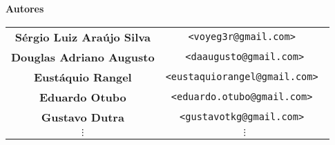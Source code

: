 \documentclass[10pt,a4paper,openany]{book}
\begin{document}
\newpage
\thispagestyle{empty}

\begin{center}
{\Huge \bf Autores}

\vspace{2cm}

\begin{tabular}{cc}

\bf Sérgio Luiz Araújo Silva & \tt <voyeg3r@gmail.com> \\
\bf Douglas Adriano Augusto & \tt <daaugusto@gmail.com>\\
\bf Eustáquio Rangel & \tt <eustaquiorangel@gmail.com> \\
\bf Eduardo Otubo & \tt <eduardo.otubo@gmail.com> \\
\bf Gustavo Dutra & \tt <gustavotkg@gmail.com> \\
$\vdots$ & $\vdots$ \\

\end{tabular}

\end{center}

\newpage
\tableofcontents

\setcounter{page}{0} %

































\printindex
\end{document}
